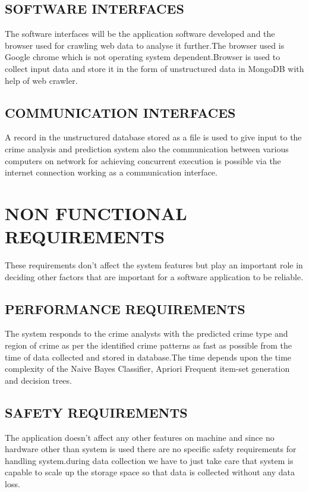 \documentclass[12pt]{extreport}
\begin{document}
    \subsection{SOFTWARE INTERFACES}
\hspace*{5em}The software interfaces will be the application software developed and the browser used for crawling web data to analyse it further.The browser used is Google chrome which is not operating system dependent.Browser is used to collect input data  and store it in the form of unstructured data in MongoDB with help of web crawler.
    
    \subsection{COMMUNICATION INTERFACES}
\hspace*{5em}A record in the unstructured database stored as a file is used to give input to the crime analysis and prediction system also the communication between various computers on network for achieving concurrent execution is possible via the internet connection working as a communication interface.
    

\section{NON FUNCTIONAL REQUIREMENTS}
\hspace*{5em}These requirements don't affect the system features but play an important role in deciding other factors that are important for a software application to be reliable.
     \subsection{PERFORMANCE REQUIREMENTS}
\hspace*{5em}The system responds to the crime analysts with the predicted crime type and region of crime as per the identified crime patterns as fast as possible  from the time of data collected and stored in database.The time depends upon the time complexity of the Naive Bayes Classifier, Apriori Frequent item-set generation and decision trees.
     \subsection{SAFETY REQUIREMENTS}
\hspace*{5em}The application doesn't affect any other features on machine and since no hardware other than system is used there are no specific safety requirements for handling system.during data collection we have to just take care that system is capable to scale up the storage space so that data is collected without any data loss.
\end{document}
